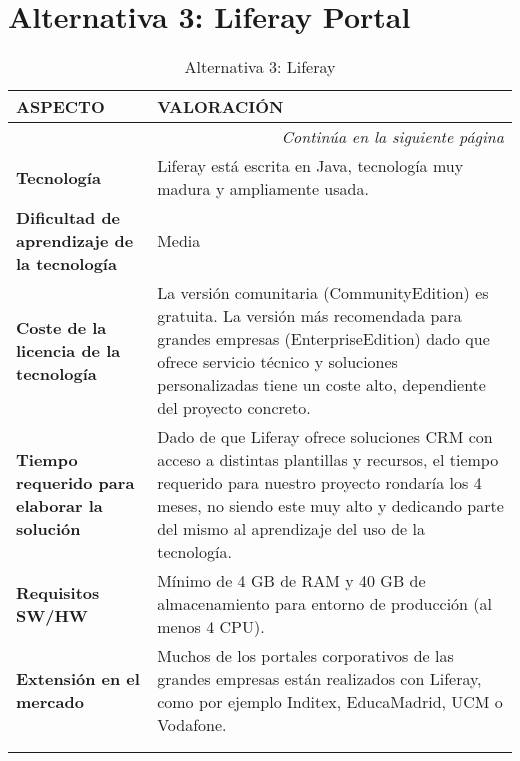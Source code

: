 \section{Alternativa 3: Liferay Portal}

\begin{center}
\begin{longtable}{p{4cm} p{8cm}}

\textbf{ASPECTO} & \textbf{VALORACIÓN} \\ \hline \hline
\endfirsthead
\endhead

\multicolumn{2}{r}{\textit{Continúa en la siguiente página}} \\
\endfoot
\endlastfoot

\textbf{Tecnología} & Liferay está escrita en Java, tecnología muy madura y ampliamente usada.\\ \hline

\textbf{Dificultad de aprendizaje de la tecnología} & Media\\ \hline

\textbf{Coste de la licencia de la tecnología} &
\par La versión comunitaria (CommunityEdition) es gratuita. La versión más recomendada para grandes empresas (EnterpriseEdition) dado que ofrece servicio técnico y soluciones personalizadas tiene un coste alto, dependiente del proyecto concreto.
\\ \hline

\textbf{Tiempo requerido para elaborar la solución} & Dado de que Liferay ofrece soluciones CRM con acceso a distintas plantillas y recursos, el tiempo requerido para nuestro proyecto rondaría los 4 meses, no siendo este muy alto y dedicando parte del mismo al aprendizaje del uso de la tecnología.\\ \hline

\textbf{Requisitos SW/HW} & Mínimo de 4 GB de RAM y 40 GB de almacenamiento para entorno de producción (al menos 4 CPU).\\ \hline

\textbf{Extensión en el mercado} & Muchos de los portales corporativos de las grandes empresas están realizados con Liferay, como por ejemplo Inditex, EducaMadrid, UCM o Vodafone.\\ \hline \hline


\caption{Alternativa 3: Liferay}\\
\label{tab:alternative3}
\end{longtable}
\end{center}
